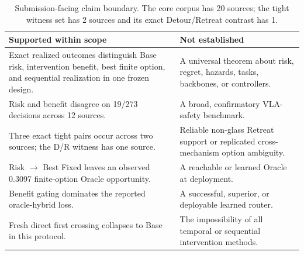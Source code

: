 \begin{table}[H]
\centering
\small
\begin{tabularx}{\linewidth}{@{}Y Y@{}}
\toprule
Supported within scope & Not established \\
\midrule
Exact realized outcomes distinguish Base risk, intervention benefit, best
finite option, and sequential realization in one frozen design. & A universal
theorem about risk, regret, hazards, tasks, backbones, or controllers. \\
Risk and benefit disagree on 19/273 decisions across 12 sources. & A broad,
confirmatory VLA-safety benchmark. \\
Three exact tight pairs occur across two sources; the D/R witness has one
source. & Reliable non-glass Retreat support or replicated cross-mechanism
option ambiguity. \\
Risk $\rightarrow$ Best Fixed leaves an observed 0.3097 finite-option Oracle
opportunity. & A reachable or learned Oracle at deployment. \\
Benefit gating dominates the reported oracle-hybrid loss. & A successful,
superior, or deployable learned router. \\
Fresh direct first crossing collapses to Base in this protocol. & The
impossibility of all temporal or sequential intervention methods. \\
\bottomrule
\end{tabularx}
\caption{Submission-facing claim boundary. The core corpus has 20 sources; the
tight witness set has 2 sources and its exact Detour/Retreat contrast has 1.}
\label{tab:claim-boundary}
\end{table}
